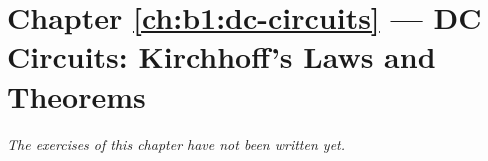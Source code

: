 \section*{Chapter \ref{ch:b1:dc-circuits} --- DC Circuits: Kirchhoff's Laws and Theorems}


\emph{The exercises of this chapter have not been written yet.}
